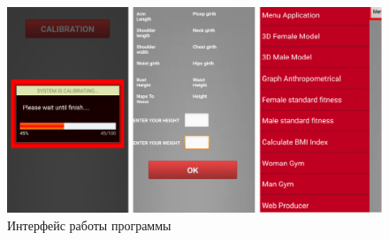 \begin{figure}[ht!]
\centering
\includegraphics [scale=0.5] {images/h39.png}
\begin{center}
\caption{Интерфейс работы программы } \label{img39}
\end{center}
\end{figure}

